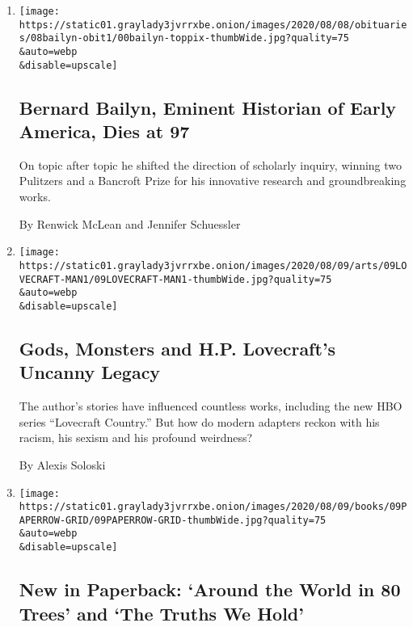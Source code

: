 \begin{enumerate}
\def\labelenumi{\arabic{enumi}.}
\item
  \href{/2020/08/07/books/bernard-bailyn-dead.html}{}

  \texttt{[image: https://static01.graylady3jvrrxbe.onion/images/2020/08/08/obituaries/08bailyn-obit1/00bailyn-toppix-thumbWide.jpg?quality=75\\\&auto=webp\\\&disable=upscale]}

  \hypertarget{bernard-bailyn-eminent-historian-of-early-america-dies-at-97}{%
  \subsection{Bernard Bailyn, Eminent Historian of Early America, Dies
  at
  97}\label{bernard-bailyn-eminent-historian-of-early-america-dies-at-97}}

  On topic after topic he shifted the direction of scholarly inquiry,
  winning two Pulitzers and a Bancroft Prize for his innovative research
  and groundbreaking works.

  By Renwick McLean and Jennifer Schuessler
\item
  \href{/2020/08/07/arts/television/hp-lovecraft.html}{}

  \texttt{[image: https://static01.graylady3jvrrxbe.onion/images/2020/08/09/arts/09LOVECRAFT-MAN1/09LOVECRAFT-MAN1-thumbWide.jpg?quality=75\\\&auto=webp\\\&disable=upscale]}

  \hypertarget{gods-monsters-and-hp-lovecrafts-uncanny-legacy}{%
  \subsection{Gods, Monsters and H.P. Lovecraft's Uncanny
  Legacy}\label{gods-monsters-and-hp-lovecrafts-uncanny-legacy}}

  The author's stories have influenced countless works, including the
  new HBO series ``Lovecraft Country.'' But how do modern adapters
  reckon with his racism, his sexism and his profound weirdness?

  By Alexis Soloski
\item
  \href{/2020/08/07/books/review/new-paperbacks.html}{}

  \texttt{[image: https://static01.graylady3jvrrxbe.onion/images/2020/08/09/books/09PAPERROW-GRID/09PAPERROW-GRID-thumbWide.jpg?quality=75\\\&auto=webp\\\&disable=upscale]}

  \hypertarget{new-in-paperback-around-the-world-in-80-trees-and-the-truths-we-hold}{%
  \subsection{New in Paperback: `Around the World in 80 Trees' and `The
  Truths We
  Hold'}\label{new-in-paperback-around-the-world-in-80-trees-and-the-truths-we-hold}}


\end{enumerate}
